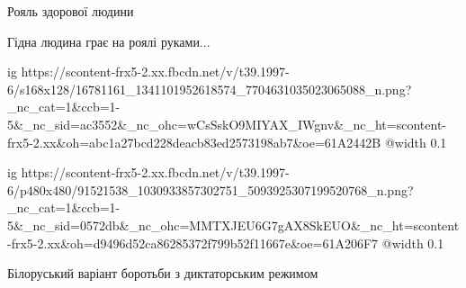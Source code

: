  
 
 
 
 

Рояль здорової людини

Гідна людина грає на роялі руками...


\ifcmt
  ig https://scontent-frx5-2.xx.fbcdn.net/v/t39.1997-6/s168x128/16781161_1341101952618574_7704631035023065088_n.png?_nc_cat=1&ccb=1-5&_nc_sid=ac3552&_nc_ohc=wCsSskO9MIYAX_IWgnv&_nc_ht=scontent-frx5-2.xx&oh=abc1a27bcd228deacb83ed2573198ab7&oe=61A2442B
  @width 0.1
\fi


\ifcmt
  ig https://scontent-frx5-2.xx.fbcdn.net/v/t39.1997-6/p480x480/91521538_1030933857302751_5093925307199520768_n.png?_nc_cat=1&ccb=1-5&_nc_sid=0572db&_nc_ohc=MMTXJEU6G7gAX8SkEUO&_nc_ht=scontent-frx5-2.xx&oh=d9496d52ca86285372f799b52f11667e&oe=61A206F7
  @width 0.1
\fi

Білоруський варіант боротьби з диктаторським режимом

